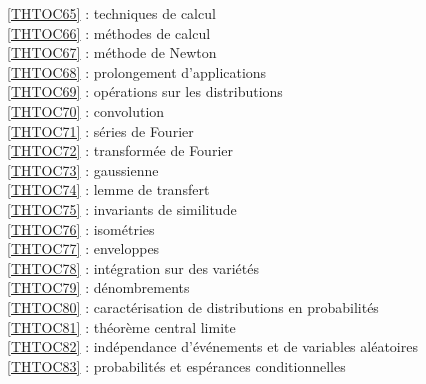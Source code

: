 \ref {THTOC65} : techniques de calcul\\
\ref {THTOC66} : méthodes de calcul\\
\ref {THTOC67} : méthode de Newton\\
\ref {THTOC68} : prolongement d'applications\\
\ref {THTOC69} : opérations sur les distributions\\
\ref {THTOC70} : convolution\\
\ref {THTOC71} : séries de Fourier\\
\ref {THTOC72} : transformée de Fourier\\
\ref {THTOC73} : gaussienne\\
\ref {THTOC74} : lemme de transfert\\
\ref {THTOC75} : invariants de similitude\\
\ref {THTOC76} : isométries\\
\ref {THTOC77} : enveloppes\\
\ref {THTOC78} : intégration sur des variétés\\
\ref {THTOC79} : dénombrements\\
\ref {THTOC80} : caractérisation de distributions en probabilités\\
\ref {THTOC81} : théorème central limite\\
\ref {THTOC82} : indépendance d'événements et de variables aléatoires\\
\ref {THTOC83} : probabilités et espérances conditionnelles\\
